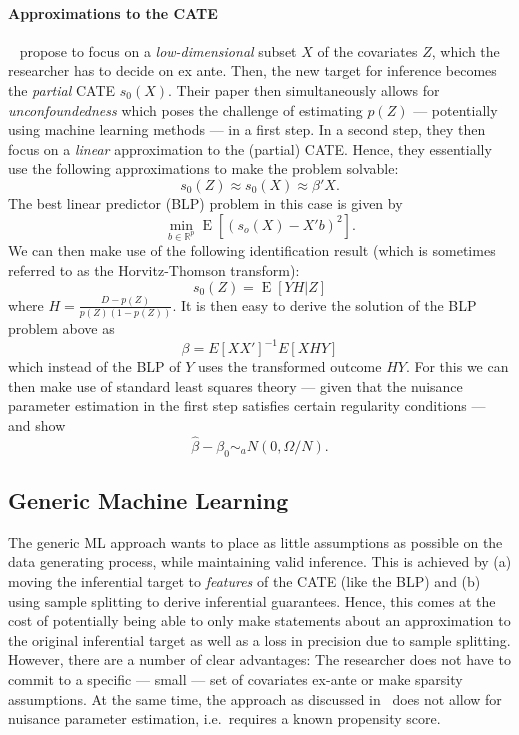 \documentclass[11pt, a4paper, leqno]{article}
\DeclareMathOperator{\E}{E}
\begin{document}
\paragraph*{Approximations to the CATE}
~\citet{semenova2021debiased} propose to focus on a \textit{low-dimensional} subset $X$ of the covariates $Z$, which the researcher has to decide on ex ante.
Then, the new target for inference becomes the \textit{partial} CATE $s_0(X)$.
Their paper then simultaneously allows for \textit{unconfoundedness} which poses the challenge of estimating $p(Z)$ --- potentially using machine learning methods --- in a first step.
In a second step, they then focus on a \textit{linear} approximation to the (partial) CATE\@.
Hence, they essentially use the following approximations to make the problem solvable:
\begin{equation*}
    s_0(Z) \approx s_0(X) \approx \beta'X.
\end{equation*}
The best linear predictor (BLP) problem in this case is given by
\begin{equation*}
    \min_{b\in\mathbb{R}^p} \E [(s_o(X) - X'b)^2].
\end{equation*}
We can then make use of the following identification result (which is sometimes referred to as the Horvitz-Thomson transform):
\begin{equation*}
    s_0(Z) = \E[YH|Z]
\end{equation*}
where $H = \frac{D-p(Z)}{p(Z)(1-p(Z))}$.
It is then easy to derive the solution of the BLP problem above as
\begin{equation*}
    \beta = E[XX']^{-1}E[XHY]
\end{equation*}
which instead of the BLP of $Y$ uses the transformed outcome $HY$.
For this we can then make use of standard least squares theory --- given that the nuisance parameter estimation in the first step satisfies certain regularity conditions --- and show
\begin{equation*}
    \hat{\beta} - \beta_0 \sim_a N(0, \Omega/N).
\end{equation*}


\subsection{Generic Machine Learning}
The generic ML approach wants to place as little assumptions as possible on the data generating process, while maintaining valid inference.
This is achieved by (a) moving the inferential target to \textit{features} of the CATE (like the BLP) and (b) using sample splitting to derive inferential guarantees.
Hence, this comes at the cost of potentially being able to only make statements about an approximation to the original inferential target as well as a loss in precision due to sample splitting.
However, there are a number of clear advantages: The researcher does not have to commit to a specific --- small --- set of covariates ex-ante or make sparsity assumptions.
At the same time, the approach as discussed in~\citet{chernozhukov2023genml} does not allow for nuisance parameter estimation, i.e.\ requires a known propensity score.
\end{document}
